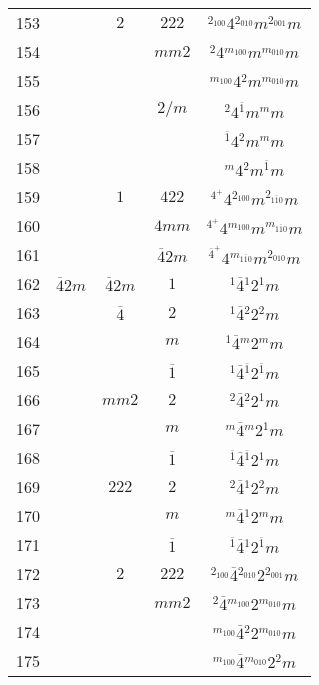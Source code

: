 \begin{longtable}{ccccc}
  153 &  & $2$ & $222$ & ${}^{2_{100}} 4 {}^{2_{010}} m {}^{2_{001}} m $\\
  154 &  &  & $mm2$ & ${}^{2} 4 {}^{m_{100}} m {}^{m_{010}} m $\\
  155 &  &  &  & ${}^{m_{100}} 4 {}^{2} m {}^{m_{010}} m $\\
  156 &  &  & $2/m$ & ${}^{2} 4 {}^{\overline{1}} m {}^{m} m $\\
  157 &  &  &  & ${}^{\overline{1}} 4 {}^{2} m {}^{m} m $\\
  158 &  &  &  & ${}^{m} 4 {}^{2} m {}^{\overline{1}} m $\\
  159 &  & $1$ & $422$ & ${}^{4^{+}} 4 {}^{2_{100}} m {}^{2_{1\overline{1}0}} m $\\
  160 &  &  & $4mm$ & ${}^{4^{+}} 4 {}^{m_{100}} m {}^{m_{1\overline{1}0}} m $\\
  161 &  &  & $\overline{4}2m$ & ${}^{\overline{4}^{+}} 4 {}^{m_{1\overline{1}0}} m {}^{2_{010}} m $\\
  162 & $\overline{4}2m$ & $\overline{4}2m$ & $1$ & ${}^{1} \overline{4} {}^{1} 2 {}^{1} m $\\
  163 &  & $\overline{4}$ & $2$ & ${}^{1} \overline{4} {}^{2} 2 {}^{2} m $\\
  164 &  &  & $m$ & ${}^{1} \overline{4} {}^{m} 2 {}^{m} m $\\
  165 &  &  & $\overline{1}$ & ${}^{1} \overline{4} {}^{\overline{1}} 2 {}^{\overline{1}} m $\\
  166 &  & $mm2$ & $2$ & ${}^{2} \overline{4} {}^{2} 2 {}^{1} m $\\
  167 &  &  & $m$ & ${}^{m} \overline{4} {}^{m} 2 {}^{1} m $\\
  168 &  &  & $\overline{1}$ & ${}^{\overline{1}} \overline{4} {}^{\overline{1}} 2 {}^{1} m $\\
  169 &  & $222$ & $2$ & ${}^{2} \overline{4} {}^{1} 2 {}^{2} m $\\
  170 &  &  & $m$ & ${}^{m} \overline{4} {}^{1} 2 {}^{m} m $\\
  171 &  &  & $\overline{1}$ & ${}^{\overline{1}} \overline{4} {}^{1} 2 {}^{\overline{1}} m $\\
  172 &  & $2$ & $222$ & ${}^{2_{100}} \overline{4} {}^{2_{010}} 2 {}^{2_{001}} m $\\
  173 &  &  & $mm2$ & ${}^{2} \overline{4} {}^{m_{100}} 2 {}^{m_{010}} m $\\
  174 &  &  &  & ${}^{m_{100}} \overline{4} {}^{2} 2 {}^{m_{010}} m $\\
  175 &  &  &  & ${}^{m_{100}} \overline{4} {}^{m_{010}} 2 {}^{2} m $\\

\end{longtable}
